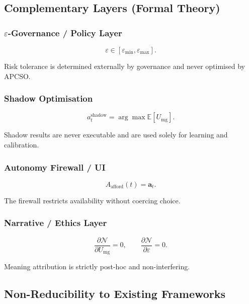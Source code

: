 \subsection{Complementary Layers (Formal Theory)}

\subsubsection{$\varepsilon$-Governance / Policy Layer}

\begin{equation}
\varepsilon \in [\varepsilon_{\min}, \varepsilon_{\max}].
\end{equation}

Risk tolerance is determined externally by governance and never
optimised by APCSO.

\subsubsection{Shadow Optimisation}

\begin{equation}
a_t^{\mathrm{shadow}} =
\arg\max \mathbb{E}[U_{\mathrm{mg}}].
\end{equation}

Shadow results are never executable and are used solely for learning
and calibration.

\subsubsection{Autonomy Firewall / UI}

\begin{equation}
A_{\mathrm{afford}}(t) = \mathbf{a}_t.
\end{equation}

The firewall restricts availability without coercing choice.

\subsubsection{Narrative / Ethics Layer}

\begin{equation}
\frac{\partial \mathcal{N}}{\partial U_{\mathrm{mg}}} = 0,
\qquad
\frac{\partial \mathcal{N}}{\partial \varepsilon} = 0.
\end{equation}

Meaning attribution is strictly post-hoc and non-interfering.

\subsection{Non-Reducibility to Existing Frameworks}

